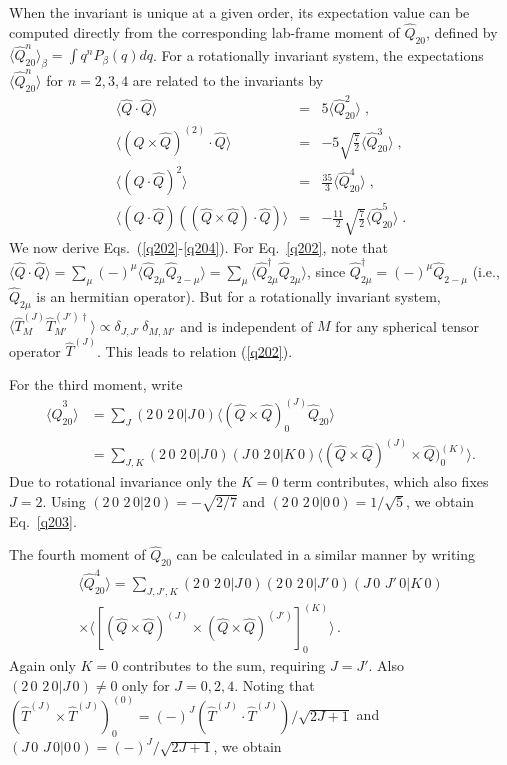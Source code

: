 \documentclass[prc,twocolumn,aps,showpacs,floatfix,nofootinbib,letterpaper,preprintnumbers]{revtex4-1}
\newcommand{\cg}[6]{(#1 \, #2 \,\, #3 \, #4|#5 \, #6)}
\begin{document}
When the invariant  is unique at a given order, its expectation value can be computed directly from the corresponding lab-frame moment of $\hat Q_{20}$, defined by  $\langle \hat Q_{20}^n \rangle_\beta =  \int  q^n P_\beta(q)d q$. For a rotationally invariant system, the expectations $\langle \hat{Q}^n_{20}\rangle$ for $n=2,3,4$ are related to the invariants by~\cite{al14}
\begin{eqnarray}
   \langle \hat{Q} \cdot \hat{Q} \rangle & = & 5 \langle \hat{Q}_{20}^2 \rangle \;, \label{q202}\\
 \langle (\hat{Q} \times \hat{Q})^{(2)} \cdot \hat{Q} \rangle & = &   - 5 \sqrt{\frac{7}{2}} \langle \hat{Q}_{20}^3 \rangle \;, \label{q203}\\
  \langle (\hat{Q} \cdot \hat{Q})^2 \rangle & = &  \frac{35}{3} \langle \hat{Q}_{20}^4 \rangle \;,\label{q204}\\
 \langle (\hat Q \cdot \hat Q) ((\hat Q \times \hat Q ) \cdot \hat Q) \rangle & = &  -\frac{11}{2} \sqrt{\frac{7}{2}} \langle \hat{Q}_{20}^5 \rangle \;.\label{q205}
\end{eqnarray}
We now derive Eqs.~(\ref{q202}-\ref{q204}). For Eq.~\eqref{q202}, note that $\langle \hat{Q} \cdot \hat{Q} \rangle = \sum_\mu (-)^{\mu} \langle \hat{Q}_{2 \mu} \hat{Q}_{2  -\mu} \rangle = \sum_{\mu} \langle \hat{Q}_{2 \mu}^\dagger \hat{Q}_{2 \mu} \rangle$, since $\hat{Q}_{2 \mu}^\dagger = (-)^\mu \hat{Q}_{2 -\mu}$ (i.e., $\hat Q_{2\mu}$ is an hermitian operator). But for a rotationally invariant system, $\langle \hat{T}^{(J)}_{M} \hat{T}^{(J')\dagger}_{M'}\rangle \propto \delta_{J,J'} \, \delta_{M,M'}$ and is independent of $M$ for any spherical tensor operator $\hat{T}^{(J)}$. This leads to relation (\ref{q202}).

For the third moment, write
\begin{align}
  \langle \hat{Q}_{20}^3 \rangle & = \sum_{J} \cg{2}{0}{2}{0}{J}{0} \langle (\hat{Q} \times \hat{Q})^{(J)}_0 \hat{Q}_{20}\rangle \\
  & = \sum_{J, K} \cg{2}{0}{2}{0}{J}{0}  \cg{J}{0}{2}{0}{K}{0} \langle(\hat{Q} \! \times \! \hat{Q})^{(J)} \! \times \! \hat{Q})^{(K)}_{0}\rangle .
\end{align}
Due to rotational invariance only the $K=0$ term contributes, which also fixes $J=2$. Using $\cg{2}{0}{2}{0}{2}{0} = -\sqrt{2/7}$ and $\cg{2}{0}{2}{0}{0}{0} = 1/\sqrt{5}$, we obtain Eq.~\eqref{q203}.

The fourth moment of $\hat Q_{20}$ can be calculated in a similar manner by writing
\begin{multline}
  \langle \hat{Q}_{20}^4 \rangle = \sum_{J,J',K} \cg{2}{0}{2}{0}{J}{0} \cg{2}{0}{2}{0}{J'}{0} \cg{J}{0}{J'}{0}{K}{0} \\
  \times \langle [(\hat{Q} \times \hat{Q})^{(J)} \times (\hat{Q} \times \hat{Q})^{(J')}]^{(K)}_{0}\rangle \,.
\end{multline}
Again only $K=0$ contributes to the sum, requiring $J=J'$. Also $\cg{2}{0}{2}{0}{J}{0} \neq 0$ only for $J=0,2,4$. Noting that $(\hat{T}^{(J)} \times \hat{T}^{(J)})^{(0)}_0 = (-)^{J} (\hat{T}^{(J)} \cdot \hat{T}^{(J)})/\sqrt{2J+1}$ and $\cg{J}{0}{J}{0}{0}{0} = (-)^{J}/\sqrt{2J+1}$, we obtain
\end{document}
